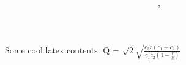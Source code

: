 \documentclass{article}
\author{\nombre , \carnet}
\title{\textbf{\Huge\titulo}}
\begin{document}
%

\maketitle

Some cool latex contents.
Q = $\sqrt{2} \sqrt{\frac{c_{3} r \left(c_{1} + c_{2}\right)}{c_{1} c_{2} \left(1 - \frac{r}{k}\right)}}$
\end{document}

